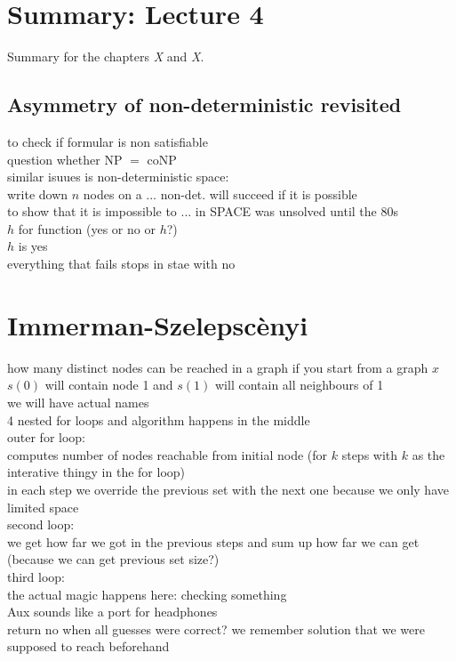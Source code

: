 \documentclass[a4]{scrartcl}
\begin{document}
\section*{Summary: Lecture 4}

Summary for the chapters \textit{X} and \textit{X}. \cite{book}

\subsection*{Asymmetry of non-deterministic revisited}

to check if formular is non satisfiable \\
question whether NP $=$ coNP \\

similar isuues is non-deterministic space: \\
write down $n$ nodes on a ... non-det. will succeed if it is possible \\
to show that it is impossible to ... in SPACE was unsolved until the 80s \\
$h$ for function (yes or no or $h$?) \\
$h$ is yes \\
everything that fails stops in stae with no \\


\section*{Immerman-Szelepscènyi}

how many distinct nodes can be reached in a graph if you start from a graph $x$ \\
$s(0)$ will contain node 1 and $s(1)$ will contain all neighbours of 1 \\
we will have actual names \\
4 nested for loops and algorithm happens in the middle \\
outer for loop: \\
computes number of nodes reachable from initial node (for $k$ steps with $k$ as the interative thingy in the for loop) \\
in each step we override the previous set with the next one because we only have limited space \\
second loop: \\
we get how far we got in the previous steps and sum up how far we can get (because we can get previous set size?) \\
third loop: \\
the actual magic happens here: checking something \\
Aux sounds like a port for headphones \\
return no when all guesses were correct? we remember solution that we were supposed to reach beforehand \\







\newpage

\printbibliography
\end{document}
